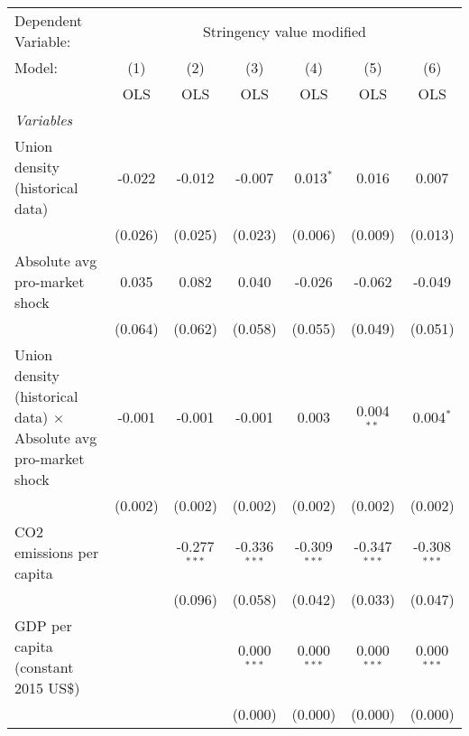 
\begingroup
\centering
\begin{tabular}{lcccccc}
   \toprule
   Dependent Variable: & \multicolumn{6}{c}{Stringency value modified}\\
   Model:                                                                  & (1)     & (2)            & (3)            & (4)            & (5)            & (6)\\  
                                                                           &  OLS    & OLS            & OLS            & OLS            & OLS            & OLS\\  
   \midrule
   \emph{Variables}\\
   Union density (historical data)                                         & -0.022  & -0.012         & -0.007         & 0.013$^{*}$    & 0.016          & 0.007\\   
                                                                           & (0.026) & (0.025)        & (0.023)        & (0.006)        & (0.009)        & (0.013)\\   
   Absolute avg pro-market shock                                           & 0.035   & 0.082          & 0.040          & -0.026         & -0.062         & -0.049\\   
                                                                           & (0.064) & (0.062)        & (0.058)        & (0.055)        & (0.049)        & (0.051)\\   
   Union density (historical data) $\times$ Absolute avg pro-market shock  & -0.001  & -0.001         & -0.001         & 0.003          & 0.004$^{**}$   & 0.004$^{*}$\\   
                                                                           & (0.002) & (0.002)        & (0.002)        & (0.002)        & (0.002)        & (0.002)\\   
   CO2 emissions per capita                                                &         & -0.277$^{***}$ & -0.336$^{***}$ & -0.309$^{***}$ & -0.347$^{***}$ & -0.308$^{***}$\\   
                                                                           &         & (0.096)        & (0.058)        & (0.042)        & (0.033)        & (0.047)\\   
   GDP per capita (constant 2015 US\$)                                     &         &                & 0.000$^{***}$  & 0.000$^{***}$  & 0.000$^{***}$  & 0.000$^{***}$\\   
                                                                           &         &                & (0.000)        & (0.000)        & (0.000)        & (0.000)\\   

\end{tabular}
